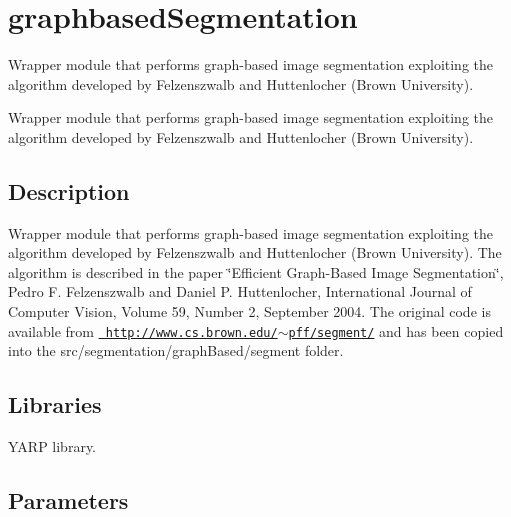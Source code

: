 \section{graphbased\+Segmentation}
\label{group__icub__graphbasedSegmentation}


Wrapper module that performs graph-\/based image segmentation exploiting the algorithm developed by Felzenszwalb and Huttenlocher (Brown University).  


Wrapper module that performs graph-\/based image segmentation exploiting the algorithm developed by Felzenszwalb and Huttenlocher (Brown University). 

\hypertarget{group__seg2cloud_intro_sec}{}\subsection{Description}\label{group__seg2cloud_intro_sec}
Wrapper module that performs graph-\/based image segmentation exploiting the algorithm developed by Felzenszwalb and Huttenlocher (Brown University). The algorithm is described in the paper \char`\"{}\+Efficient Graph-\/\+Based Image Segmentation\char`\"{}, Pedro F. Felzenszwalb and Daniel P. Huttenlocher, International Journal of Computer Vision, Volume 59, Number 2, September 2004. The original code is available from \href{http://www.cs.brown.edu/~pff/segment/}{\texttt{ http\+://www.\+cs.\+brown.\+edu/$\sim$pff/segment/}} and has been copied into the src/segmentation/graph\+Based/segment folder.\hypertarget{group__blobExtractor_lib_sec}{}\subsection{Libraries}\label{group__blobExtractor_lib_sec}
Y\+A\+RP library.\hypertarget{group__seg2cloud_parameters_sec}{}\subsection{Parameters}\label{group__seg2cloud_parameters_sec}

